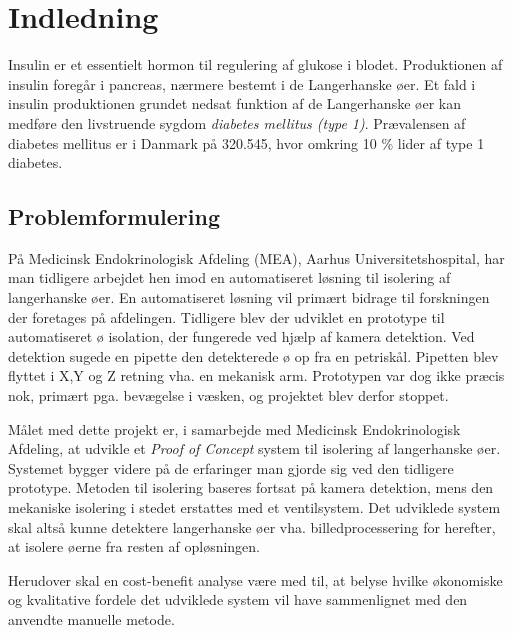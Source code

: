 \chapter{Indledning}
Insulin er et essentielt hormon til regulering af glukose i blodet. Produktionen af insulin foregår i pancreas, nærmere bestemt i de Langerhanske øer. Et fald i insulin produktionen grundet nedsat funktion af de Langerhanske øer kan medføre den livstruende sygdom \textit{diabetes mellitus (type 1)}. Prævalensen af diabetes mellitus er i Danmark på 320.545, hvor omkring 10 \% lider af type 1 diabetes. 









\section{Problemformulering}
På Medicinsk Endokrinologisk Afdeling (MEA), Aarhus Universitetshospital, har man tidligere arbejdet hen imod en automatiseret løsning til isolering af langerhanske øer. En automatiseret løsning vil primært bidrage til forskningen der foretages på afdelingen. Tidligere blev der udviklet en prototype til automatiseret ø isolation, der fungerede ved hjælp af kamera detektion. Ved detektion sugede en pipette den detekterede ø op fra en petriskål. Pipetten blev flyttet i X,Y og Z retning vha. en mekanisk arm. Prototypen var dog ikke præcis nok, primært pga. bevægelse i væsken, og projektet blev derfor stoppet.

Målet med dette projekt er, i samarbejde med Medicinsk Endokrinologisk Afdeling, at udvikle et \textit{Proof of Concept} system til isolering af langerhanske øer. Systemet bygger videre på de erfaringer man gjorde sig ved den tidligere prototype. Metoden til isolering baseres fortsat på kamera detektion, mens den mekaniske isolering i stedet erstattes med et ventilsystem. Det udviklede system skal altså kunne detektere langerhanske øer vha. billedprocessering for herefter, at isolere øerne fra resten af opløsningen. 

Herudover skal en cost-benefit analyse være med til, at belyse hvilke økonomiske og kvalitative fordele det udviklede system vil have sammenlignet med den anvendte manuelle metode.

